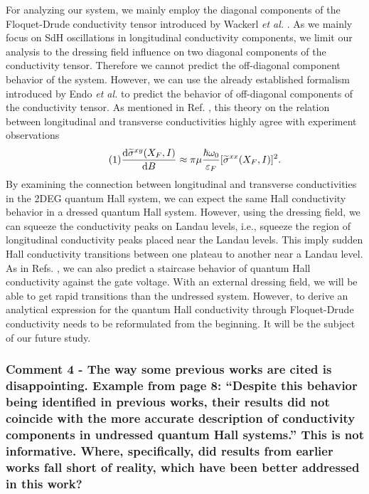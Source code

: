 \documentclass{article}
\begin{document}
For analyzing our system, we mainly employ the diagonal components of the Floquet-Drude conductivity tensor introduced by Wackerl \textit{et al.} \cite{wackerl20}. As we mainly focus on SdH oscillations in longitudinal conductivity components, we limit our analysis to the dressing field influence on two diagonal components of the conductivity tensor.
Therefore we cannot predict the off-diagonal component behavior of the system. However, we can use the already established formalism introduced by Endo \textit{et al.} \cite{endo09} to predict the behavior of off-diagonal components of the conductivity tensor. As mentioned in Ref. \cite{endo09}, this theory on the relation between longitudinal and transverse conductivities highly agree with  experiment observations
\begin{equation} \tag{1}
  \dv{\widetilde{\sigma}^{xy}(X_F,I)}{B} \approx
    \pi\mu \frac{\hbar \omega_0}{\varepsilon_F} [\widetilde{\sigma}^{xx}(X_F,I)]^2.
\end{equation}
By examining the connection between longitudinal and transverse conductivities in the 2DEG quantum Hall system, we can expect the same Hall conductivity behavior in a dressed quantum Hall system. However, using the dressing field, we can squeeze the conductivity peaks on Landau levels, i.e., squeeze the region of longitudinal conductivity peaks placed near the Landau levels. This  imply sudden Hall conductivity transitions between one plateau to another near a Landau level. As in Refs.  \cite{klitzing80,gusynin06}, we can also predict a staircase behavior of quantum Hall conductivity against the gate voltage. With an external dressing field, we will be able to get rapid transitions than the undressed system. However, to derive an analytical expression for the quantum Hall conductivity through Floquet-Drude conductivity needs to be reformulated from the beginning. It will be the subject of our future study.

\subsubsection*{Comment 4 -
\color{RoyalBlue} The way some previous works are cited is disappointing. Example from page 8: “Despite this behavior being identified in previous works, their results did not coincide with the more accurate description of conductivity components in undressed quantum Hall systems.” This is not informative. Where, specifically, did results from earlier works fall short of reality, which have been better addressed in this work?
}
\end{document}
